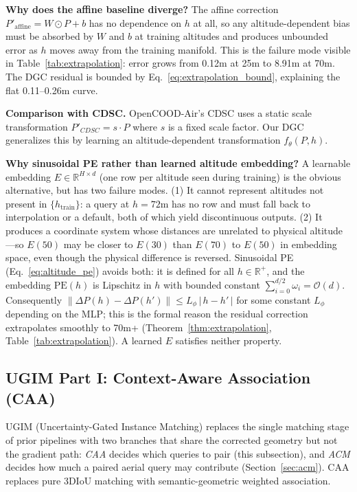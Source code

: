 \documentclass[9.5pt,twocolumn,a4paper]{IEEEtran}
\begin{document}
\textbf{Why does the affine baseline diverge?} The affine correction $P'_{\text{affine}} = W \odot P + b$ has no dependence on $h$ at all, so any altitude-dependent bias must be absorbed by $W$ and $b$ at training altitudes and produces unbounded error as $h$ moves away from the training manifold. This is the failure mode visible in Table~\ref{tab:extrapolation}: error grows from 0.12m at 25m to 8.91m at 70m. The DGC residual is bounded by Eq.~\ref{eq:extrapolation_bound}, explaining the flat 0.11--0.26m curve.

\textbf{Comparison with CDSC.} OpenCOOD-Air's CDSC uses a static scale transformation $P'_{CDSC} = s \cdot P$ where $s$ is a fixed scale factor. Our DGC generalizes this by learning an altitude-dependent transformation $f_\theta(P, h)$.

\textbf{Why sinusoidal PE rather than learned altitude embedding?}
A learnable embedding $E \in \mathbb{R}^{H \times d}$ (one row per altitude seen during training) is the obvious alternative, but has two failure modes. (1) It cannot represent altitudes not present in $\{h_{\text{train}}\}$: a query at $h=72$m has no row and must fall back to interpolation or a default, both of which yield discontinuous outputs. (2) It produces a coordinate system whose distances are unrelated to physical altitude---so $E(50)$ may be closer to $E(30)$ than $E(70)$ to $E(50)$ in embedding space, even though the physical difference is reversed. Sinusoidal PE (Eq.~\ref{eq:altitude_pe}) avoids both: it is defined for all $h \in \mathbb{R}^+$, and the embedding $\text{PE}(h)$ is Lipschitz in $h$ with bounded constant $\sum_{i=0}^{d/2} \omega_i = \mathcal{O}(d)$. Consequently $\|\Delta P(h) - \Delta P(h')\| \le L_{\phi}\,|\,h-h'\,|$ for some constant $L_{\phi}$ depending on the MLP; this is the formal reason the residual correction extrapolates smoothly to 70m+ (Theorem~\ref{thm:extrapolation}, Table~\ref{tab:extrapolation}). A learned $E$ satisfies neither property.

\subsection{UGIM Part I: Context-Aware Association (CAA)}
\label{sec:ugim}

UGIM (Uncertainty-Gated Instance Matching) replaces the single matching stage of prior pipelines with two branches that share the corrected geometry but not the gradient path: \emph{CAA} decides which queries to pair (this subsection), and \emph{ACM} decides how much a paired aerial query may contribute (Section~\ref{sec:acm}). CAA replaces pure 3DIoU matching with semantic-geometric weighted association.
\end{document}
